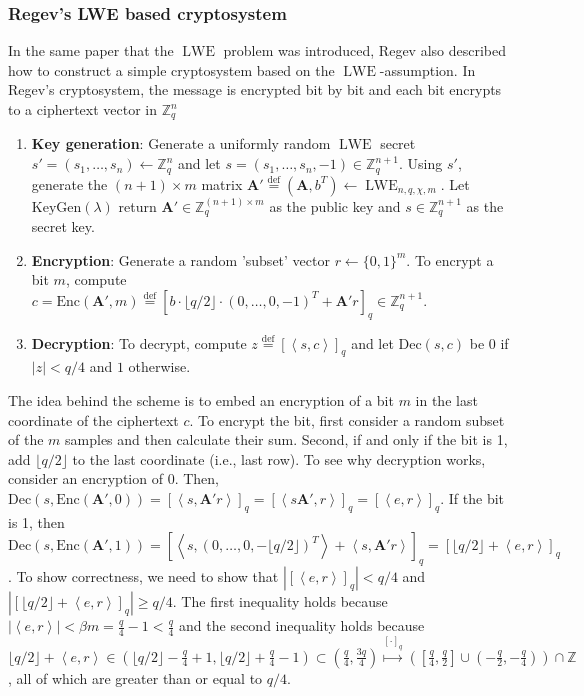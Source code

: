 \subsubsection*{Regev's LWE based cryptosystem}
In the same paper that the $\operatorname{LWE}$ problem was introduced, Regev also described how to construct a simple cryptosystem based on the $\operatorname{LWE}$-assumption. In Regev's cryptosystem, the message is encrypted bit by bit and each bit encrypts to a ciphertext vector in $\mathbb{Z}_q^n$
\begin{enumerate}
    \item \textbf{Key generation}: Generate a uniformly random $\operatorname{LWE}$ secret $s' = (s_1, \dots, s_n) \leftarrow \mathbb{Z}_q^n$ and let $s = (s_1, \dots, s_n, -1) \in \mathbb{Z}_q^{n+1}$. Using $s'$, generate the $(n+1) \times m$ matrix $\textbf{A}' \stackrel{\mathrm{def}}{=} (\textbf{A}, b^T) \leftarrow \operatorname{LWE}_{n,q,\chi,m}$. Let $\text{KeyGen}(\lambda)$ return $\textbf{A}' \in \mathbb{Z}_q^{(n+1)\times m}$ as the public key and $s \in \mathbb{Z}_q^{n+1}$ as the secret key.
    \item \textbf{Encryption}: Generate a random 'subset' vector $r \leftarrow \{0,1\}^m$. To encrypt a bit $m$, compute $c = \text{Enc}(\textbf{A}',m) \stackrel{\mathrm{def}}{=} [b \cdot \lfloor q/2 \rfloor \cdot (0, \dots, 0, -1)^T + \textbf{A}'r]_q \in \mathbb{Z}_q^{n+1}$.
    \item \textbf{Decryption}: To decrypt, compute $z \stackrel{\mathrm{def}}{=} [\left \langle s, c \right \rangle]_q$ and let $\text{Dec}(s,c)$ be $0$ if $|z| < q/4$ and $1$ otherwise.
\end{enumerate}

The idea behind the scheme is to embed an encryption of a bit $m$ in the last coordinate of the ciphertext $c$. To encrypt the bit, first consider a random subset of the $m$ samples and then calculate their sum. Second, if and only if the bit is 1, add $\lfloor q/2 \rfloor$ to the last coordinate (i.e., last row). To see why decryption works, consider an encryption of $0$. Then, $\text{Dec}(s,\text{Enc}(\textbf{A}',0))= [\left \langle s, \textbf{A}'r \right \rangle]_q = [\left \langle s \textbf{A}', r \right \rangle]_q = [\left \langle e, r \right \rangle]_q$. If the bit is 1, then $\text{Dec}(s,\text{Enc}(\textbf{A}',1)) = [\left \langle s, (0, \dots, 0, -\lfloor q/2 \rfloor)^T \right \rangle + \left \langle s, \textbf{A}'r \right \rangle ]_q = [\lfloor q/2 \rfloor + \left \langle e, r \right \rangle]_q$.
To show correctness, we need to show that $|[\left \langle e, r \right \rangle]_q| < q/4$ and $|[\lfloor q/2 \rfloor + \left \langle e, r \right \rangle]_q| \geq q/4$. The first inequality holds because $| \left \langle e, r \right \rangle | < \beta m = \frac{q}{4} - 1 < \frac{q}{4}$ and the second inequality holds because $\lfloor q/2 \rfloor + \left \langle e, r \right \rangle \in (\lfloor q/2 \rfloor - \frac{q}{4} + 1, \lfloor q/2 \rfloor + \frac{q}{4} - 1) \subset (\frac{q}{4},\frac{3q}{4}) \stackrel{[\cdot]_q}{\mapsto} ([\frac{q}{4},\frac{q}{2}] \cup (-\frac{q}{2} , -\frac{q}{4})) \cap \mathbb{Z}$, all of which are greater than or equal to $q/4$.


